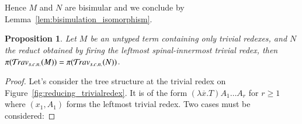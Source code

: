 \documentclass{elsarticle}
\def\proofatend{\begin{proof}}
\def\endproofatend{\end{proof}}
\theoremstyle{plain}
\newtheorem{proposition}[theorem]{Proposition}
\theoremstyle{definition}
\newcommand{\travsetscn}{\travset_{s.c.n.}} %
\def\coresymbol{\pi} %
\begin{document}
Hence $M$ and $N$ are bisimular and we conclude by Lemma~\ref{lem:bisimulation_isomorphism}.

\begin{proposition}%
\label{prop:ulctrav_sound_for_trivialreduction}
    Let $M$ be an untyped term containing only trivial redexes, and $N$ the reduct obtained by firing the \emph{leftmost spinal-innermost} trivial redex, then $\coresymbol(\travsetscn(M)) = \coresymbol(\travsetscn(N))$.
\end{proposition}
\begin{proof}
Let's consider the tree structure at the trivial redex on Figure~\ref{fig:reducing_trivialredex}. It is of the form $(\lambda \overline{x} . T) A_1 \ldots A_r$ for $r\geq1$ where $(x_1, A_1)$ forms the leftmost trivial redex.
    Two cases must be considered:


\end{proof}
\end{document}
